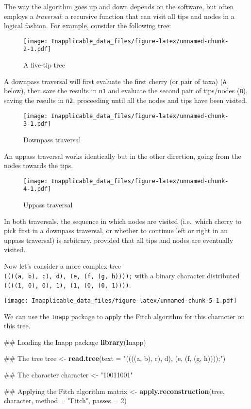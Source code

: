\documentclass[]{book}
\newenvironment{Shaded}{\begin{snugshade}}{\end{snugshade}}
\newcommand{\KeywordTok}[1]{\textcolor[rgb]{0.13,0.29,0.53}{\textbf{#1}}}
\newcommand{\DataTypeTok}[1]{\textcolor[rgb]{0.13,0.29,0.53}{#1}}
\newcommand{\DecValTok}[1]{\textcolor[rgb]{0.00,0.00,0.81}{#1}}
\newcommand{\StringTok}[1]{\textcolor[rgb]{0.31,0.60,0.02}{#1}}
\newcommand{\NormalTok}[1]{#1}
\theoremstyle{definition}
\theoremstyle{definition}
\theoremstyle{definition}
\theoremstyle{remark}
\begin{document}
The way the algorithm goes up and down depends on the software, but
often employs a \emph{traversal}: a recursive function that can visit
all tips and nodes in a logical fashion. For example, consider the
following tree:

\begin{figure}
\centering
\texttt{[image: Inapplicable\_data\_files/figure-latex/unnamed-chunk-2-1.pdf]}
\caption{\label{fig:unnamed-chunk-2}A five-tip tree}
\end{figure}

A downpass traversal will first evaluate the first cherry (or pair of
taxa) (\texttt{A} below), then save the results in \texttt{n1} and
evaluate the second pair of tips/nodes (\texttt{B}), saving the results
in \texttt{n2}, proceeding until all the nodes and tips have been
visited.

\begin{figure}
\centering
\texttt{[image: Inapplicable\_data\_files/figure-latex/unnamed-chunk-3-1.pdf]}
\caption{\label{fig:unnamed-chunk-3}Downpass traversal}
\end{figure}

An uppass traversal works identically but in the other direction, going
from the nodes towards the tips.

\begin{figure}
\centering
\texttt{[image: Inapplicable\_data\_files/figure-latex/unnamed-chunk-4-1.pdf]}
\caption{\label{fig:unnamed-chunk-4}Uppass traversal}
\end{figure}

In both traversals, the sequence in which nodes are visited (i.e.~which
cherry to pick first in a downpass traversal, or whether to continue
left or right in an uppass traversal) is arbitrary, provided that all
tips and nodes are eventually visited.

Now let's consider a more complex tree
\texttt{((((a,\ b),\ c),\ d),\ (e,\ (f,\ (g,\ h))));} with a binary
character distributed
\texttt{((((1,\ 0),\ 0),\ 1),\ (1,\ (0,\ (0,\ 1))))}:

\texttt{[image: Inapplicable\_data\_files/figure-latex/unnamed-chunk-5-1.pdf]}

We can use the \texttt{Inapp} package to apply the Fitch algorithm for
this character on this tree.

\begin{Shaded}
\begin{Highlighting}[]
\NormalTok{## Loading the Inapp package}
\KeywordTok{library}\NormalTok{(Inapp)}

\NormalTok{## The tree}
\NormalTok{tree <-}\StringTok{ }\KeywordTok{read.tree}\NormalTok{(}\DataTypeTok{text =} \StringTok{"((((a, b), c), d), (e, (f, (g, h))));"}\NormalTok{)}

\NormalTok{## The character}
\NormalTok{character <-}\StringTok{ "10011001"}

\NormalTok{## Applying the Fitch algorithm}
\NormalTok{matrix <-}\StringTok{ }\KeywordTok{apply.reconstruction}\NormalTok{(tree, character, }\DataTypeTok{method =} \StringTok{"Fitch"}\NormalTok{, }\DataTypeTok{passes =} \DecValTok{2}\NormalTok{)}
\end{Highlighting}
\end{Shaded}
\end{document}
